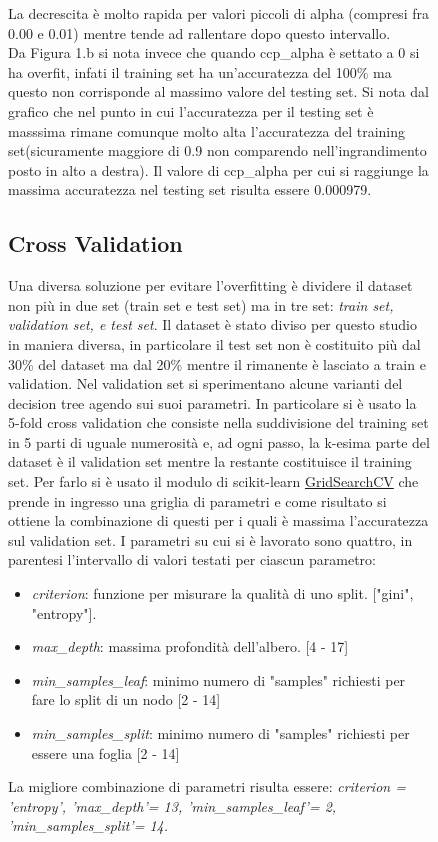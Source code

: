 \documentclass[]{article}
\begin{document}
\begin{figure}

La decrescita è molto rapida per valori piccoli di alpha (compresi fra 0.00 e 0.01) mentre tende ad rallentare dopo questo intervallo.\\
Da Figura 1.b si nota invece che quando ccp\_alpha è settato a 0 si ha overfit, infati il training set ha un'accuratezza del 100\% ma questo non corrisponde al massimo valore del testing set.
Si nota dal grafico che nel punto in cui l'accuratezza per il testing set è masssima rimane comunque molto alta l'accuratezza del training set(sicuramente maggiore di 0.9 non comparendo nell'ingrandimento posto in alto a destra). Il valore di ccp\_alpha per cui si raggiunge la massima accuratezza nel testing set risulta essere 0.000979.

\subsection{Cross Validation}
Una diversa soluzione per evitare l'overfitting è dividere il dataset non più in due set (train set e test set) ma in tre set: \textit{train set, validation set, e test set}. Il dataset è stato diviso per questo studio in maniera diversa, in particolare il test set non è costituito più dal 30\% del dataset ma dal 20\% mentre il rimanente è lasciato a train e validation. Nel validation set si sperimentano alcune varianti del decision tree agendo sui suoi parametri. 
In particolare si è usato la 5-fold cross validation che consiste nella suddivisione del training set in 5 parti di uguale numerosità e, ad ogni passo, la k-esima parte del dataset è il validation set mentre la restante costituisce il training set. 
Per farlo si è usato il modulo di scikit-learn \href{https://scikit-learn.org/stable/modules/generated/sklearn.model_selection.GridSearchCV.html}{GridSearchCV} che prende in ingresso una griglia di parametri e come risultato si ottiene la combinazione di questi per i quali è massima l'accuratezza sul validation set. I parametri su cui si è lavorato sono quattro, in parentesi l'intervallo di valori testati per ciascun parametro:
\begin{itemize}
\item \textit{criterion}: funzione per misurare la qualità di uno split. ["gini", "entropy"].
\item \textit{max\_depth}: massima profondità dell'albero. [4 - 17]
\item \textit{min\_samples\_leaf}: minimo numero di "samples" richiesti per fare lo split di un nodo [2 - 14]
\item \textit{min\_samples\_split}: minimo numero di "samples" richiesti per essere una foglia [2 - 14]
\end{itemize}
La migliore combinazione di parametri risulta essere: \textit{criterion = 'entropy', 'max\_depth'= 13, 'min\_samples\_leaf'= 2, 'min\_samples\_split'= 14.}



\end{figure}
\end{document}
